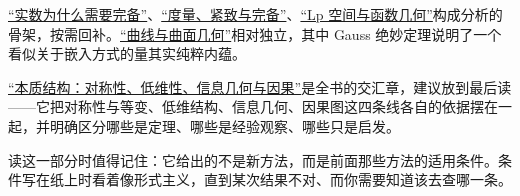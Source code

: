 \hyperref[ch:097]{``实数为什么需要完备''}、\hyperref[ch:099]{``度量、紧致与完备''}、\hyperref[ch:103]{``Lp 空间与函数几何''}构成分析的骨架，按需回补。\hyperref[ch:107]{``曲线与曲面几何''}相对独立，其中 Gauss 绝妙定理说明了一个看似关于嵌入方式的量其实纯粹内蕴。

\hyperref[ch:106]{``本质结构：对称性、低维性、信息几何与因果''}是全书的交汇章，建议放到最后读——它把对称性与等变、低维结构、信息几何、因果图这四条线各自的依据摆在一起，并明确区分哪些是定理、哪些是经验观察、哪些只是启发。

读这一部分时值得记住：它给出的不是新方法，而是前面那些方法的适用条件。条件写在纸上时看着像形式主义，直到某次结果不对、而你需要知道该去查哪一条。
